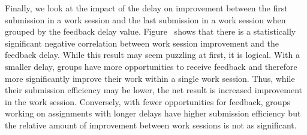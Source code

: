 Finally, we look at the impact of the delay on improvement between the first
submission in a work session and the last submission in a work session when
grouped by the feedback delay value. Figure~
shows that there is a statistically significant negative correlation between
work session improvement and the feedback delay. While this result may seem
puzzling at first, it is logical. With a smaller delay, groups have more
opportunities to receive feedback and therefore more significantly improve
their work within a single work session. Thus, while their submission
efficiency may be lower, the net result is increased improvement in the work
session. Conversely, with fewer opportunities for feedback, groups working on
assignments with longer delays have higher submission efficiency but the
relative amount of improvement between work sessions is not as significant.
